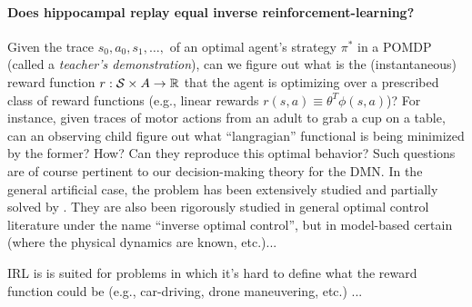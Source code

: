 \documentclass[10pt,letterpaper]{article}
\begin{document}
\paragraph{Does hippocampal replay equal inverse reinforcement-learning?}
  Given the trace $s_0,a_0,s_1,\ldots,$ of an optimal agent's strategy $\pi^*$ in
  a POMDP (called a \textit{teacher's demonstration}), can we figure out what is the
  (instantaneous) reward function $r: \mathcal S \times \mathcal \mathcal A
  \rightarrow \mathbb R$ that the agent is optimizing over a prescribed class of reward functions
  (e.g., linear rewards $r(s,a) \equiv \theta^T\phi(s,a)$)?
  For instance, given traces of motor actions from an adult to grab a cup on a table,
  can an observing child figure out what ``langragian'' functional is being minimized by the former?
  How? Can they reproduce this optimal behavior?
Such questions are of course pertinent to our decision-making theory for the DMN.
In the general artificial case, the problem has been extensively studied and partially solved by
\cite{abbeel2004}. They are also been rigorously studied in general optimal control literature under the name
``inverse optimal control'', but in model-based certain (where the physical dynamics are known, etc.)...

IRL is is suited for problems in which it's hard to define what the reward function could be
(e.g.,  car-driving, drone maneuvering, etc.) ...
\end{document}
